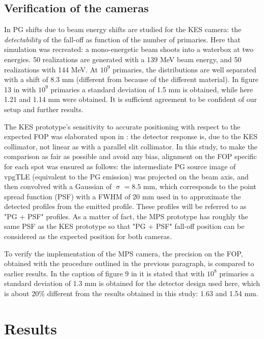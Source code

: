 \documentclass[a4paper,english]{article}
\begin{document}
\subsection{Verification of the cameras}

In \cite{Priegnitz2015} PG shifts due to beam energy shifts are studied for the KES camera: the \emph{detectability} of the fall-off as function of the number of primaries. Here that simulation was recreated: a mono-energetic beam shoots into a waterbox at two energies. 50 realizations are generated with a 139 MeV beam energy, and 50 realizations with 144 MeV. At $10^9$ primaries, the distributions are well separated with a shift of 8.3 mm (different from \cite{Priegnitz2015} because of the different material). In figure 13 in \cite{Perali2014} with $10^9$ primaries a standard deviation of 1.5 mm is obtained, while here 1.21 and 1.14 mm were obtained. It is sufficient agreement to be confident of our setup and further results.

The KES prototype's sensitivity to accurate positioning with respect to the expected FOP was elaborated upon in \citet[Section IV.A.3]{Sterpin2015}: the detector response is, due to the KES collimator, not linear as with a parallel slit collimator. In this study, to make the comparison as fair as possible and avoid any bias, alignment on the FOP specific for each spot was ensured as follows: the intermediate PG source image of vpgTLE (equivalent to the PG emission) was projected on the beam axis, and then convolved with a Gaussian of $\upsigma = 8.5$ mm, which corresponds to the point spread function (PSF) with a FWHM of 20 mm used in \cite{Priegnitz2015} to approximate the detected profiles from the emitted profile. These profiles will be referred to as "PG + PSF" profiles. As a matter of fact, the MPS prototype has roughly the same PSF as the KES prototype so that "PG + PSF" fall-off position can be considered as the expected position for both cameras.

To verify the implementation of the MPS camera, the precision on the FOP, obtained with the procedure outlined in the previous paragraph, is compared to earlier results. In the caption of figure 9 in \cite{Pinto2014a} it is stated that with $10^8$ primaries a standard deviation of 1.3 mm is obtained for the detector design used here, which is about 20\% different from the results obtained in this study: 1.63 and 1.54 mm.

\section{Results}
\end{document}
